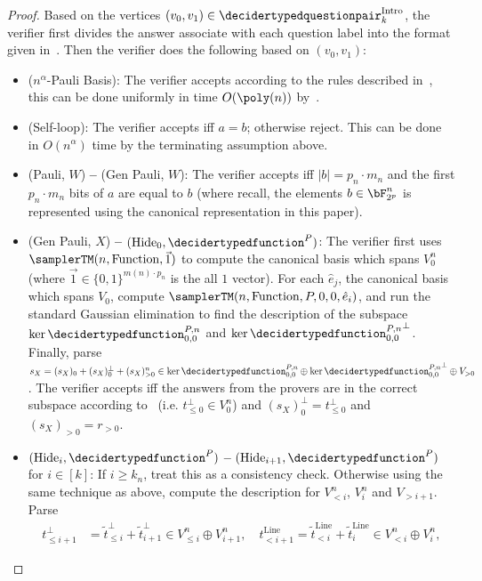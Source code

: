 \begin{proof}
	Based on the vertices $(v_0, v_1) \in \decidertypedquestionpair^{\text{Intro}}_k$, the verifier first divides the answer associate with each question label into the format given in~. Then the verifier does the following based on $(v_0, v_1)$:
	\begin{itemize}
		\item ($n^{\alpha}$-Pauli Basis): The verifier accepts according to the rules described in~, this can be done uniformly in time $O(\poly(n))$ by~. 
		\item (Self-loop): The verifier accepts iff $a = b$; otherwise reject. This can be done in $O(n^{\alpha})$ time by the terminating assumption above. 
		\item (Pauli, $W$) \textbf{--}  (Gen Pauli, $W$): The verifier accepts iff $|b| = p_n \cdot m_n$ and the first $p_n \cdot m_n$ bits of $a$ are equal to $b$ (where recall, the elements $b \in \bF_{2^p}^n$ is represented using the canonical representation in this paper). 
		\item (Gen Pauli, $X$) \textbf{--} $(\text{Hide}_0, \decidertypedfunction^{P})$: The verifier first uses $\samplerTM(n, \text{Function}, \vec{1})$ to compute the canonical basis which spans $V_0^n$ (where $\vec{1} \in \{0,1\}^{m(n) \cdot p_n}$ is the all $1$ vector). For each $\hat{e}_j$, the canonical basis which spans $V_0$, compute $\samplerTM(n, \text{Function}, P, 0, 0, \hat{e}_i)$, and run the standard Gaussian elimination to find the description of the subspace $\ker{\decidertypedfunction^{P, n}_{0,0}}$ and $\ker{\decidertypedfunction^{P, n}_{0,0}}^{\bot}$. Finally, parse $s_{X} =  (s_{X})_{0} +(s_{X})_{0}^{\bot} + (s_{X})_{> 0}^n \in \ker{\decidertypedfunction^{P, n}_{0,0}} \oplus\ker{\decidertypedfunction^{P, n}_{0,0}}^{\bot} \oplus V_{> 0}$. The verifier accepts iff the answers from the provers are in the correct subspace according to~ (i.e. $ t_{\leq 0}^{\bot} \in V_0^n$) and $(s_{X})_{0}^{\bot} = t_{\leq 0}^{\bot}$ and $(s_{X})_{> 0} =  r_{> 0}$. 
		\item $(\text{Hide}_{i}, \decidertypedfunction^{P})$ \textbf{--}  $(\text{Hide}_{i+1}, \decidertypedfunction^{P})$ for $i \in [k]$: If $i \geq k_n$, treat this as a consistency check. Otherwise using the same technique as above, compute the description for $V_{< i}^n$, $V_i^n$ and $V_{> i+1}$. Parse 
		\begin{align*}
			t_{\leq i+1 }^{\bot} &= 	\tilde{t}_{\leq i }^{\bot} + \tilde{t}_{ i +1}^{\bot} \in V_{\leq i}^n \oplus V_{i+1}^n, \quad t_{< i+1 }^{\text{Line}} = 	\tilde{t}_{< i}^{\text{Line}} + \tilde{t}_{ i}^{\text{Line}} \in V_{< i}^n \oplus V_{i}^n,

\end{align*}
\end{itemize}
\end{proof}
